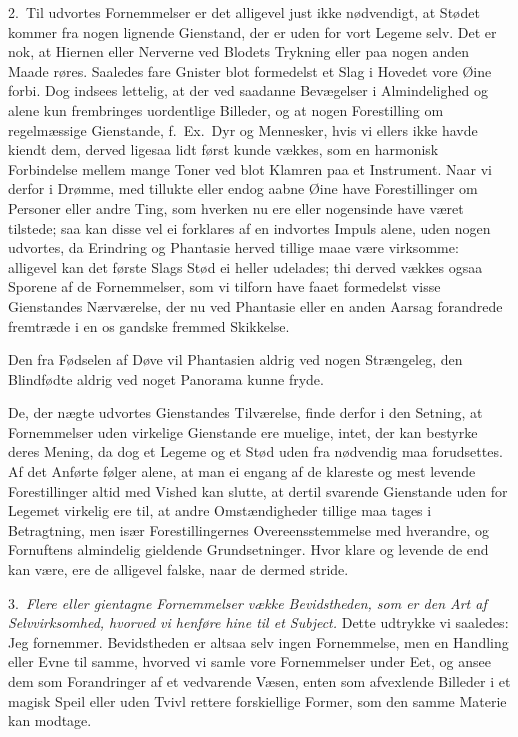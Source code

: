 \documentclass[12pt,a4paper]{article}
\newcommand{\opage}[1]{\marginnote{\footnotesize\textit{[#1]}}}
\begin{document}
2.~Til udvortes Fornemmelser er det alligevel just ikke nødvendigt, at Stødet
kommer fra nogen lignende Gienstand, der er uden for vort Legeme selv. Det er
\opage{36} nok, at Hiernen eller Nerverne ved Blodets Trykning eller paa nogen anden Maade
røres. Saaledes fare Gnister blot formedelst et Slag i Hovedet vore Øine forbi.
Dog indsees lettelig, at der ved saadanne Bevægelser i Almindelighed og alene kun
frembringes uordentlige Billeder, og at nogen Forestilling om regelmæssige
Gienstande, f.~Ex.\ Dyr og Mennesker, hvis vi ellers ikke havde kiendt dem, derved
ligesaa lidt først kunde vækkes, som en harmonisk Forbindelse mellem mange Toner
ved blot Klamren paa et Instrument. Naar vi derfor i Drømme, med tillukte eller
endog aabne Øine have Forestillinger om Personer eller andre Ting, som hverken nu
ere eller nogensinde have været tilstede; saa kan disse vel ei forklares af en
indvortes Impuls alene, uden nogen udvortes, da Erindring og Phantasie herved
tillige maae være virksomme: alligevel kan det første Slags Stød ei heller udelades;
thi derved vækkes ogsaa Sporene af de Fornemmelser, som vi tilforn have faaet
formedelst visse Gienstandes Nærværelse, der nu ved Phantasie eller en anden Aarsag
forandrede fremtræde i en os gandske fremmed Skikkelse.

Den fra Fødselen af Døve vil Phantasien aldrig ved nogen Strængeleg, den
Blindfødte aldrig ved noget Panorama kunne fryde.

De, der nægte udvortes Gienstandes Tilværelse, finde derfor i den Setning, at
Fornemmelser uden virkelige Gienstande ere muelige, intet, der kan bestyrke
\opage{37} deres Mening, da dog et Legeme og et Stød uden fra nødvendig maa forudsettes. Af
det Anførte følger alene, at man ei engang af de klareste og mest levende
Forestillinger altid med Vished kan slutte, at dertil svarende Gienstande uden for
Legemet virkelig ere til, at andre Omstændigheder tillige maa tages i Betragtning,
men især Forestillingernes Overeensstemmelse med hverandre, og Fornuftens almindelig
gieldende Grundsetninger. Hvor klare og levende de end kan være, ere de alligevel
falske, naar de dermed stride.

3.~\emph{Flere eller gientagne Fornemmelser vække Bevidstheden, som er den Art af
Selvvirksomhed, hvorved vi henføre hine til et Subject.} Dette udtrykke vi
saaledes: Jeg fornemmer. Bevidstheden er altsaa selv ingen Fornemmelse, men en
Handling eller Evne til samme, hvorved vi samle vore Fornemmelser under Eet, og
ansee dem som Forandringer af et vedvarende Væsen, enten som afvexlende Billeder i
et magisk Speil eller uden Tvivl rettere forskiellige Former, som den samme Materie
kan modtage.
\end{document}
